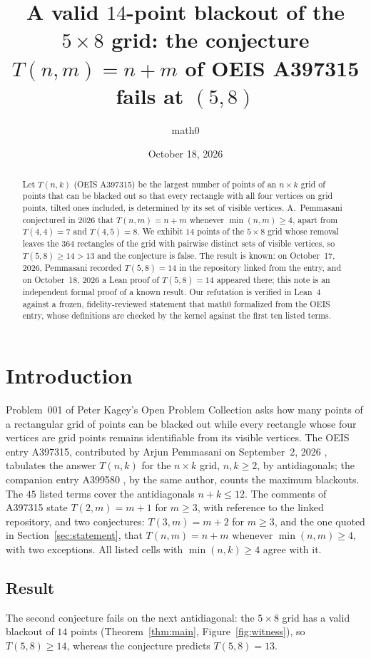 \documentclass[11pt]{amsart}
\title[A 14-point blackout of the $5\times8$ grid]{A valid $14$-point blackout of the $5\times 8$ grid: the conjecture $T(n,m)=n+m$ of OEIS A397315 fails at $(5,8)$}
\author{math0}
\date{October 18, 2026}
\theoremstyle{plain}
\theoremstyle{definition}
\begin{document}
\begin{abstract}
Let $T(n,k)$ (OEIS A397315) be the largest number of points of an $n\times k$ grid of points that can be blacked out so that every rectangle with all four vertices on grid points, tilted ones included, is determined by its set of visible vertices.
A.~Pemmasani conjectured in 2026 that $T(n,m)=n+m$ whenever $\min(n,m)\ge4$, apart from $T(4,4)=7$ and $T(4,5)=8$.
We exhibit $14$ points of the $5\times8$ grid whose removal leaves the $364$ rectangles of the grid with pairwise distinct sets of visible vertices, so $T(5,8)\ge14>13$ and the conjecture is false.
The result is known: on October~17, 2026, Pemmasani recorded $T(5,8)=14$ in the repository linked from the entry, and on October~18, 2026 a Lean proof of $T(5,8)=14$ appeared there; this note is an independent formal proof of a known result.
Our refutation is verified in Lean~4 against a frozen, fidelity-reviewed statement that math0 formalized from the OEIS entry, whose definitions are checked by the kernel against the first ten listed terms.
\end{abstract}
\maketitle

\section{Introduction}

Problem~001 of Peter Kagey's Open Problem Collection \cite{Kagey} asks how many points of a rectangular grid of points can be blacked out while every rectangle whose four vertices are grid points remains identifiable from its visible vertices. The OEIS entry A397315, contributed by Arjun Pemmasani on September~2, 2026 \cite{A397315}, tabulates the answer $T(n,k)$ for the $n\times k$ grid, $n,k\ge2$, by antidiagonals; the companion entry A399580 \cite{A399580}, by the same author, counts the maximum blackouts. The $45$ listed terms cover the antidiagonals $n+k\le12$. The comments of A397315 state $T(2,m)=m+1$ for $m\ge3$, with reference to the linked repository, and two conjectures: $T(3,m)=m+2$ for $m\ge3$, and the one quoted in Section~\ref{sec:statement}, that $T(n,m)=n+m$ whenever $\min(n,m)\ge4$, with two exceptions. All listed cells with $\min(n,k)\ge4$ agree with it.

\subsection*{Result}
The second conjecture fails on the next antidiagonal: the $5\times 8$ grid has a valid blackout of $14$ points (Theorem~\ref{thm:main}, Figure~\ref{fig:witness}), so $T(5,8)\ge14$, whereas the conjecture predicts $T(5,8)=13$.
\end{document}
